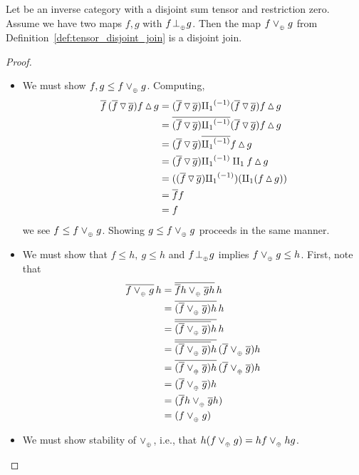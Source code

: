 \begin{proposition}\label{prop:disjointness_tensor_gives_disjoint_join}
  Let \X be an inverse category with a disjoint sum tensor and restriction zero. Assume we have two
  maps $f,g$ with $f\tperp g$. Then the map $f \tjoin g$ from
  Definition~\ref{def:tensor_disjoint_join} is a disjoint join.
\end{proposition}
\begin{proof}
  \begin{itemize}
    \item [\axiom{DJ}{1}] We must show $f, g \le f \tjoin g$. Computing,
      \begin{align*}
        \rst{f}\,(\rst{f}\tjleft\rst{g})  f\tjright g
          &= (\rst{f}\tjleft\rst{g}) \icpa (\rst{f}\tjleft\rst{g} ) f\tjright g \\
        &=\rst{(\rst{f}\tjleft\rst{g}) \icpa} (\rst{f}\tjleft\rst{g}) f\tjright g  \\
        &=(\rst{f}\tjleft\rst{g}) \rst{\icpa} f\tjright g  \\
        &=(\rst{f}\tjleft\rst{g}) \icpa \cpa f\tjright g \\
        &=((\rst{f}\tjleft\rst{g}) \icpa) (\cpa (f \tjright g)) \\
        &= \rst{f} f \\
        &=f
      \end{align*}
      we see $f \le f \tjoin g$. Showing $g \le f \tjoin g$ proceeds in the same manner.
    \item [\axiom{DJ}{2}] We must show that $f \le h,\ g\le h$ and $f\tperp g$ implies
      $f \tjoin g \le h$. First, note that
      \begin{align*}
        \rst{f \tjoin g} \,h & = \rst{\rst{f} h \tjoin \rst{g} h} \,h\\
        & = \rst{(\rst{f} \tjoin \rst{g})h} \,h\\
        & = \rst{\rst{(\rst{f} \tjoin \rst{g})}h} \,h\\
        & = \rst{\rst{(\rst{f} \tjoin \rst{g})}h}\,(\rst{f} \tjoin \rst{g})h\\
        & = \rst{(\rst{f} \tjoin \rst{g})h}\,(\rst{f} \tjoin \rst{g})h\\
        & = (\rst{f}\tjoin \rst{g})h\\
        & = (\rst{f}h\tjoin \rst{g}h)\\
        & = (f\tjoin g)
      \end{align*}
    \item [\axiom{DJ}{3}] We must show stability of $\tjoin$, i.e., that
      $h(f\tjoin g) = h f \tjoin h g$.


\end{itemize}
\end{proof}
